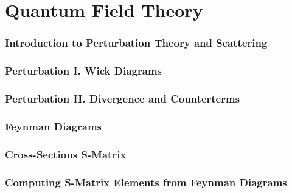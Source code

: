 \documentclass[12pt]{article}
\numberwithin{equation}{section}
\begin{document}
\part{Quantum Field Theory}
\section{Introduction to Perturbation Theory and Scattering} 
\section{Perturbation I. Wick Diagrams}
\section{Perturbation II. Divergence and Counterterms}
\section{Feynman Diagrams}
\section{Cross-Sections S-Matrix}
\section{Computing S-Matrix Elements from Feynman Diagrams}
\end{document}
